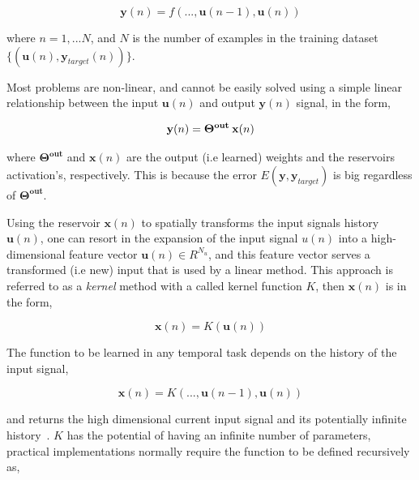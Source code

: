 \documentclass{WitsPhysicsReport}
\begin{document}
\begin{equation}
\mathbf{y}(n) = f( ...,\mathbf{u}(n-1), \mathbf{u}(n))
\label{equ:Temporal_task_problem}
\end{equation}


where $n = 1,...N$, and $N$ is the number of examples in the training dataset $\{(\mathbf{u}(n),\mathbf{y}_{target}(n))\}$.

Most problems are non-linear, and cannot be easily solved using a simple linear relationship between the input $\mathbf{u}(n)$ and output $\mathbf{y}(n)$ signal, in the form,

\begin{equation}
\mathbf{y}(n) = \mathbf{{\Theta}^{out}} \hspace{0.2em} \mathbf{x}(n)
\label{equ:Linear_model}
\end{equation}

where $\mathbf{{\Theta}^{out}}$ and $\mathbf{x}(n)$ are the output (i.e learned) weights and the reservoirs activation's, respectively. This is because the error $E(\mathbf{y}, \mathbf{y}_{target})$ is big regardless of $\mathbf{{\Theta}^{out}}$.

Using the reservoir $\mathbf{x}(n)$ to spatially transforms the input signals history $\mathbf{u}(n)$, one can resort in the expansion of the input signal $u(n)$ into a high-dimensional feature vector $\mathbf{u}(n) \in R^{N_{u}} $, and this feature vector serves a transformed (i.e new) input that is used by a linear method. This approach is referred to as a \textit{kernel} method with a called kernel function $K$, then $\mathbf{x}(n)$ is in the form,


\begin{equation}
\mathbf{x}(n) =  K(\mathbf{u}(n))
\label{equ:kernel_expansion}
\end{equation}


The function to be learned in any temporal task depends on the history of the input signal,

\begin{equation}
\mathbf{x}(n) = K(...,\mathbf{u}(n-1),\mathbf{u}(n))
\label{equ: Kernel_memory_expansion}
\end{equation}


and returns the high dimensional current input signal and its potentially infinite history~\cite{lukovsevivcius2009reservoir}. $K$  has the potential of having an infinite number of parameters, practical implementations normally require the function to be defined recursively as,
\end{document}
